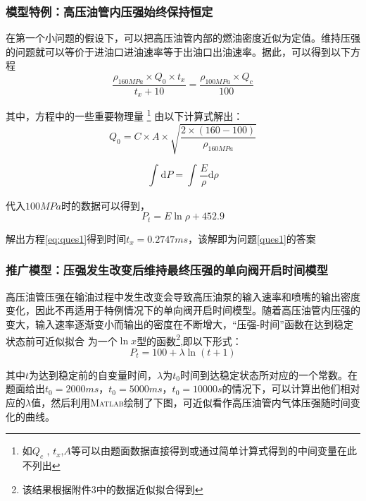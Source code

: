 \documentclass{cumcmthesis}
\begin{document}
\subsubsection{模型特例：高压油管内压强始终保持恒定}\label{case0}
在第一个小问题的假设下，可以把高压油管内部的燃油密度近似为定值。维持压强的问题就可以等价于进油口进油速率等于出油口出油速率。据此，可以得到以下方程
\begin{equation}
	\frac{ \rho_{160MPa}\times Q_{0}\times t_{x}}{t_{x}+10}=\frac{ \rho_{100MPa}\times Q_{c}}{100}\label{eq:ques1}
\end{equation}

其中，方程中的一些重要物理量 \footnote{如$Q_{c}$ , $t_{x}$,$A$等可以由题面数据直接得到或通过简单计算式得到的中间变量在此不列出} 由以下计算式解出：
\begin{equation*}
Q_{0} = C\times A\times \sqrt{\frac{2\times (160-100)}{\rho_{160MPa}}}\label{eq:ques1-1}
\end{equation*}

\begin{equation*}
	\int_{}^{}{\text{d}P} = \int_{}^{} \frac{E}{\rho}{\text{d}\rho}\label{eq:ques1-2}
\end{equation*}

代入$100MPa$时的数据可以得到，
\begin{equation}
P_{t} = E\ln\rho+452.9\label{eq:ques1-3}
\end{equation}



解出方程\cref{eq:ques1}得到时间$t_{x} = 0.2747ms$，该解即为问题\ref{ques1}的答案

\subsubsection{推广模型：压强发生改变后维持最终压强的单向阀开启时间模型}\label{case1}
高压油管压强在输油过程中发生改变会导致高压油泵的输入速率和喷嘴的输出密度变化，因此不再适用于特例情况下的单向阀开启时间模型。随着高压油管内压强的变大，输入速率逐渐变小而输出的密度在不断增大，``压强-时间''函数在达到稳定状态前可近似拟合 为一个$\ln x$型的函数\footnote{该结果根据附件3中的数据近似拟合得到},即以下形式：
\begin{equation}
	P_{t} = 100+\lambda\ln (t+1)\label{eq:ques2}	
\end{equation}

其中$t$为达到稳定前的自变量时间，$\lambda$为$t_{0}$时间到达稳定状态所对应的一个常数。在题面给出$t_{0}=2000ms$，$t_{0}=5000ms$，$t_{0}=10000s$的情况下，可以计算出他们相对应的$\lambda$值，然后利用\textsc{Matlab}绘制了下图，可近似看作高压油管内气体压强随时间变化的曲线。
\end{document}
